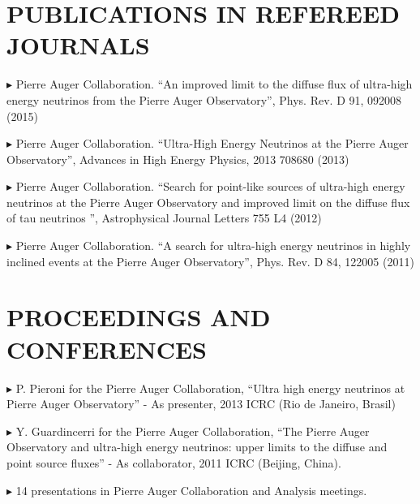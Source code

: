 \documentclass[letterpaper]{article}
\renewenvironment{itemize}{
  \begin{list}{}{
    \setlength{\leftmargin}{1.5em}
  }
}{
  \end{list}
}
\begin{document}
\section*{PUBLICATIONS IN REFEREED JOURNALS} 
\begin{itemize} \itemsep -0pt

 \item{$\blacktriangleright$} Pierre Auger Collaboration. ``An improved limit to the diffuse flux of ultra-high energy neutrinos from the Pierre Auger Observatory'', Phys. Rev. D 91, 092008 (2015)
 
 \item{$\blacktriangleright$} Pierre Auger Collaboration. ``Ultra-High Energy Neutrinos at the Pierre Auger Observatory'', Advances in High Energy Physics, 2013 708680 (2013)
 
 \item{$\blacktriangleright$} Pierre Auger Collaboration. ``Search for point-like sources of ultra-high energy neutrinos at the Pierre Auger Observatory and improved limit on the diffuse flux of tau neutrinos '', Astrophysical Journal Letters 755 L4 (2012)
 
 \item{$\blacktriangleright$} Pierre Auger Collaboration. ``A search for ultra-high energy neutrinos in highly inclined events at the Pierre Auger Observatory'', Phys. Rev. D 84, 122005 (2011)
 
\end{itemize}

 
\section*{PROCEEDINGS AND CONFERENCES} 

 \begin{itemize}\itemsep -0pt
  \item{$\blacktriangleright$} P. Pieroni for the Pierre Auger Collaboration, ``Ultra high energy neutrinos at Pierre Auger Observatory'' - As presenter, 2013 ICRC (Rio de Janeiro, Brasil)

  \item{$\blacktriangleright$} Y. Guardincerri for the Pierre Auger Collaboration, ``The Pierre Auger Observatory and ultra-high energy neutrinos: upper limits to the diffuse and point source fluxes'' - As collaborator, 2011 ICRC (Beijing, China).
  
  \item{$\blacktriangleright$} 14 presentations in Pierre Auger Collaboration and Analysis meetings.
 \end{itemize}
\end{document}
